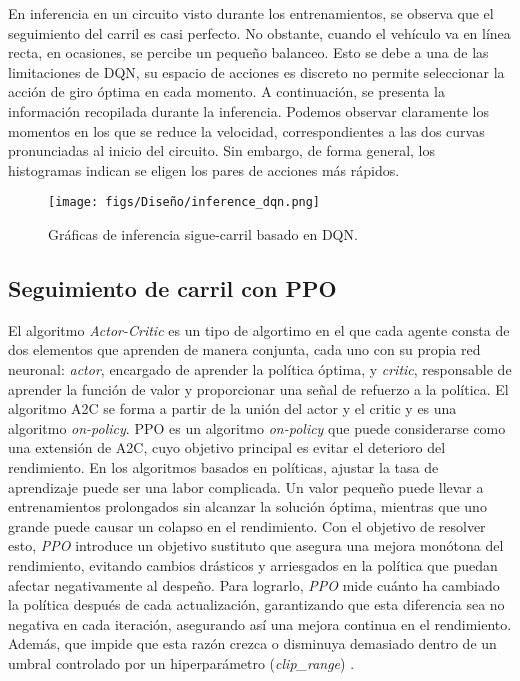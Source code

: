 En inferencia en un circuito visto durante los entrenamientos, se observa que el seguimiento del carril es casi perfecto. No obstante, cuando el vehículo va en línea recta, en ocasiones, se percibe un pequeño balanceo. Esto se debe a una de las limitaciones de \ac{DQN}, su espacio de acciones es discreto no permite seleccionar la acción de giro óptima en cada momento. A continuación, se presenta la información recopilada durante la inferencia. Podemos observar claramente los momentos en los que se reduce la velocidad, correspondientes a las dos curvas pronunciadas al inicio del circuito. Sin embargo, de forma general, los histogramas indican se eligen los pares de acciones más rápidos.
\begin{figure}[ht]
  \centering
  \texttt{[image: figs/Diseño/inference\_dqn.png]}
  \caption{Gráficas de inferencia sigue-carril basado en \ac{DQN}.}
  \label{fig:inference_dqn}
\end{figure}

\subsection{Seguimiento de carril con \ac{PPO}}

El algoritmo \textit{Actor-Critic} es un tipo de algortimo en el que cada agente consta de dos elementos que aprenden de manera conjunta, cada uno con su propia red neuronal: \textit{actor}, encargado de aprender la política óptima, y \textit{critic}, responsable de aprender la función de valor y proporcionar una señal de refuerzo a la política. El algoritmo \ac{A2C} se forma a partir de la unión del actor y el critic y es una algoritmo \textit{on-policy}. \ac{PPO} es un algoritmo \textit{on-policy} que puede considerarse como una extensión de \ac{A2C}, cuyo objetivo principal es evitar el deterioro del rendimiento. En los algoritmos basados en políticas, ajustar la tasa de aprendizaje puede ser una labor complicada. Un valor pequeño puede llevar a entrenamientos prolongados sin alcanzar la solución óptima, mientras que uno grande puede causar un colapso en el rendimiento. Con el objetivo de resolver esto, \textit{PPO} introduce un objetivo sustituto que asegura una mejora monótona del rendimiento, evitando cambios drásticos y arriesgados en la política que puedan afectar negativamente al despeño. Para lograrlo, \textit{PPO} mide cuánto ha cambiado la política después de cada actualización, garantizando que esta diferencia sea no negativa en cada iteración, asegurando así una mejora continua en el rendimiento. Además, que impide que esta razón crezca o disminuya demasiado dentro de un umbral controlado por un hiperparámetro (\textit{clip\_range}) \cite{drl}. 

